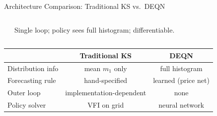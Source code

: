 \documentclass[aspectratio=169,11pt]{beamer}
\newcommand{\emphc}[1]{\textcolor{harvardcrimson}{#1}}
\begin{document}
\begin{frame}{Architecture Comparison: Traditional KS vs.\ DEQN}
\begin{columns}[T]
\begin{center}
\end{center}
{\scriptsize Single loop; policy sees \emphc{full histogram}; differentiable.}
\end{columns}

\vspace{-0.1em}
\begin{center}
\scriptsize
\begin{tabular}{lcc}
\toprule
& \textbf{Traditional KS} & \textbf{DEQN} \\
\midrule
Distribution info & mean $m_1$ only & \emphc{full histogram} \\
Forecasting rule & hand-specified & \emphc{learned (price net)} \\
Outer loop & implementation-dependent & \emphc{none} \\
Policy solver & VFI on grid & \emphc{neural network} \\
\bottomrule
\end{tabular}
\end{center}
\end{frame}
\end{document}
